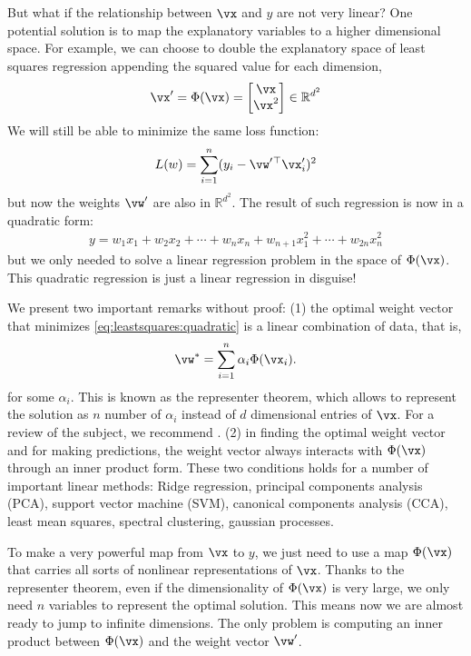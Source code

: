 \documentclass[a4paper,11pt]{exam}
\newcounter{ct}
\newcommand{\trp}{{^\top}} %
\newcommand{\field}[1]{\ensuremath{\mathbb{#1}}}
\newcommand{\reals}{\field{R}}
\begin{document}
\begin{questions}
But what if the relationship between $\vx$ and $y$ are not very linear?
One potential solution is to map the explanatory variables to a higher dimensional space.
For example, we can choose to double the explanatory space of least squares regression appending the squared value for each dimension,
\begin{align}
\vx' = \Phi(\vx) =
\begin{bmatrix}
\vx
\\
\vx^2
\end{bmatrix}
\in \reals^{d^2}
\end{align}
We will still be able to minimize the same loss function:
\begin{align}\label{eq:leastsquares:quadratic}
    L(w) = \sum_{i=1}^n (y_i - \vw'\trp \vx'_i)^2
\end{align}
but now the weights $\vw'$ are also in $\reals^{d^2}$.
The result of such regression is now in a quadratic form:
\begin{align}
	y = w_1 x_1 + w_2 x_2 + \cdots + w_n x_n + w_{n+1} x_1^2 + \cdots + w_{2n} x_n^2
\end{align}
but we only needed to solve a linear regression problem in the space of $\Phi(\vx)$.
This quadratic regression is just a linear regression in disguise!

We present two important remarks without proof:
(1) the optimal weight vector that minimizes \eqref{eq:leastsquares:quadratic} is a linear combination of data, that is,
\begin{align}\label{eq:representer:thm}
\vw^\ast = \sum_{i=1}^n \alpha_i \Phi(\vx_i).
\end{align}
for some $\alpha_i$.
This is known as the representer theorem, which allows to represent the solution as $n$ number of $\alpha_i$ instead of $d$ dimensional entries of $\vx$. For a review of the subject, we recommend \citep[Ch 4.2]{Scholkopf2002}.
(2) in finding the optimal weight vector and for making predictions, the weight vector always interacts with $\Phi(\vx)$ through an inner product form.
These two conditions holds for a number of important linear methods: Ridge regression, principal components analysis (PCA), support vector machine (SVM), canonical components analysis (CCA), least mean squares, spectral clustering, gaussian processes.

To make a very powerful map from $\vx$ to $y$, we just need to use a map $\Phi(\vx)$ that carries all sorts of nonlinear representations of $\vx$.
Thanks to the representer theorem, even if the dimensionality of $\Phi(\vx)$ is very large, we only need $n$ variables to represent the optimal solution.
This means now we are almost ready to jump to infinite dimensions.
The only problem is computing an inner product between $\Phi(\vx)$ and the weight vector $\vw'$.


\end{questions}
\end{document}
